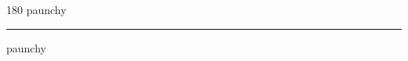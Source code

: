 
\begin{frame}
\begin{center}
\begin{turn}{180}
{\fontsize{2.5cm}{1em}\selectfont paunchy}
\end{turn}
\vspace{1em}\par  
\hrule
\vspace{1em}\par  
{\fontsize{2.5cm}{1em}\selectfont paunchy}
\end{center}
\end{frame}
